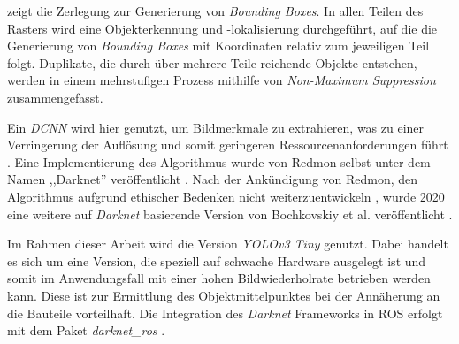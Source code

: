  zeigt die Zerlegung zur Generierung von \textit{Bounding Boxes}. In allen Teilen des Rasters wird eine Objekterkennung und -lokalisierung durchgeführt, auf die die Generierung von \textit{Bounding Boxes} mit Koordinaten relativ zum jeweiligen Teil folgt. Duplikate, die durch über mehrere Teile reichende Objekte entstehen, werden in einem mehrstufigen Prozess mithilfe von \textit{Non-Maximum Suppression} zusammengefasst. \cite[Abschnitt~4]{bandyopadhyay_yolo_2021}

\pagebreak
Ein \textit{\ac{DCNN}} wird hier genutzt, um Bildmerkmale zu extrahieren, was zu einer Verringerung der Auflösung und somit geringeren Ressourcenanforderungen führt \cite[Kapitel~V,~Absatz~A]{yurtsever_survey_2020}. Eine Implementierung des Algorithmus wurde von Redmon selbst unter dem Namen ,,Darknet'' veröffentlicht \cite{redmon_darknet_2021}. Nach der Ankündigung von Redmon, den Algorithmus aufgrund ethischer Bedenken nicht weiterzuentwickeln \cite{joseph_redmon_i_2020}, wurde 2020 eine weitere auf \textit{Darknet} basierende Version von Bochkovskiy et al. veröffentlicht \cite{bochkovskiy_yolov4_2020}.

Im Rahmen dieser Arbeit wird die Version \textit{YOLOv3 Tiny} genutzt. Dabei handelt es sich um eine Version, die speziell auf schwache Hardware ausgelegt ist und somit im Anwendungsfall mit einer hohen Bildwiederholrate betrieben werden kann. Diese ist zur Ermittlung des Objektmittelpunktes bei der Annäherung an die Bauteile vorteilhaft. Die Integration des \textit{Darknet} Frameworks in \ac{ROS} erfolgt mit dem Paket \textit{darknet\_ros} \cite{bjelonic_yolo_2016}.